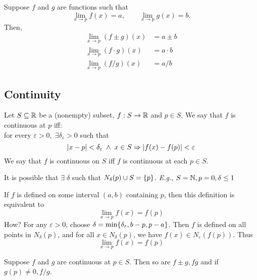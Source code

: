 \documentclass[12pt]{article}
\begin{document}
\begin{thm} \label{thm:func limit laws}
    Suppose $f$ and $g$ are functions such that \[
        \lim_{x \to p} f(x) = a, \qquad \lim_{x \to p} g(x) = b.
    \] Then,
    \begin{align}
        \lim_{x \to p} (f \pm g)(x) &= a \pm b \\
        \lim_{x \to p} (f \cdot g)(x) &= a \cdot b \\
        \lim_{x \to p} (f/g)(x) &= a/b
    \end{align}
\end{thm}

\subsection{Continuity}

\begin{defn} \label{defn:continuous}
    Let $S \subseteq \mathbb{R}$ be a (nonempty) subset, $f: S \to \mathbb{R}$ and $p \in S$. We say that $f$ is continuous at $p$ iff: \\
    for every $\varepsilon > 0, \;\exists \delta_{\varepsilon} > 0$ such that \[
        \abs{ x - p } < \delta_{\varepsilon} \;\land\; x \in S \implies \abs{ f(x) - f(p) } < \varepsilon
    \] We say that $f$ is continuous on $S$ iff $f$ is continuous at each $p \in S$.
\end{defn}

\begin{rem}
    It is possible that $\exists\; \delta$ such that $N_{\delta}(p) \cup S = \set{p}$. \textit{E.g.}, $S = \mathbb{N}, p = 0, \delta \leq 1$
\end{rem}

\begin{rem}
    If $f$ is defined on some interval $(a, b)$ containing $p$, then this definition is equivalent to \[
        \lim_{x \to p} f(x) = f(p)
    \] \textcolor{red!85!black}{How?} For any $\varepsilon > 0$, choose $\delta = \min \set{\delta_{\varepsilon}, b - p, p - a}$. Then $f$ is defined on all points in $N_{\delta}(p)$, and for all $x \in N_{\delta}(p)$, we have $f(x) \in N_{\varepsilon}(f(p))$. Thus \[
        \lim_{x \to p} f(x) = f(p)
    \]
\end{rem}

\begin{thm} \label{thm:continuity laws}
    Suppose $f$ and $g$ are continuous at $p \in S$. Then so are $f \pm g, fg$ and if $g(p) \neq 0, f/g$.
\end{thm}
\end{document}
